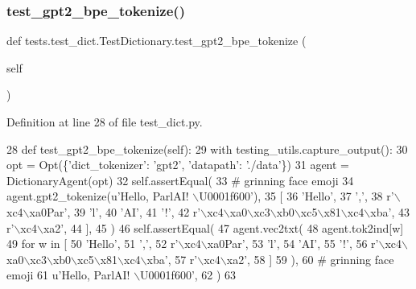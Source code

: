 \subsubsection{\texorpdfstring{test\+\_\+gpt2\+\_\+bpe\+\_\+tokenize()}{test\_gpt2\_bpe\_tokenize()}}
{\footnotesize\ttfamily def tests.\+test\+\_\+dict.\+Test\+Dictionary.\+test\+\_\+gpt2\+\_\+bpe\+\_\+tokenize (\begin{DoxyParamCaption}\item[{}]{self }\end{DoxyParamCaption})}



Definition at line 28 of file test\+\_\+dict.\+py.


\begin{DoxyCode}
28     \textcolor{keyword}{def }test\_gpt2\_bpe\_tokenize(self):
29         with testing\_utils.capture\_output():
30             opt = Opt(\{\textcolor{stringliteral}{'dict\_tokenizer'}: \textcolor{stringliteral}{'gpt2'}, \textcolor{stringliteral}{'datapath'}: \textcolor{stringliteral}{'./data'}\})
31             agent = DictionaryAgent(opt)
32         self.assertEqual(
33             \textcolor{comment}{# grinning face emoji}
34             agent.gpt2\_tokenize(\textcolor{stringliteral}{u'Hello, ParlAI! \(\backslash\)U0001f600'}),
35             [
36                 \textcolor{stringliteral}{'Hello'},
37                 \textcolor{stringliteral}{','},
38                 \textcolor{stringliteral}{r'\(\backslash\)xc4\(\backslash\)xa0Par'},
39                 \textcolor{stringliteral}{'l'},
40                 \textcolor{stringliteral}{'AI'},
41                 \textcolor{stringliteral}{'!'},
42                 \textcolor{stringliteral}{r'\(\backslash\)xc4\(\backslash\)xa0\(\backslash\)xc3\(\backslash\)xb0\(\backslash\)xc5\(\backslash\)x81\(\backslash\)xc4\(\backslash\)xba'},
43                 \textcolor{stringliteral}{r'\(\backslash\)xc4\(\backslash\)xa2'},
44             ],
45         )
46         self.assertEqual(
47             agent.vec2txt(
48                 agent.tok2ind[w]
49                 \textcolor{keywordflow}{for} w \textcolor{keywordflow}{in} [
50                     \textcolor{stringliteral}{'Hello'},
51                     \textcolor{stringliteral}{','},
52                     \textcolor{stringliteral}{r'\(\backslash\)xc4\(\backslash\)xa0Par'},
53                     \textcolor{stringliteral}{'l'},
54                     \textcolor{stringliteral}{'AI'},
55                     \textcolor{stringliteral}{'!'},
56                     \textcolor{stringliteral}{r'\(\backslash\)xc4\(\backslash\)xa0\(\backslash\)xc3\(\backslash\)xb0\(\backslash\)xc5\(\backslash\)x81\(\backslash\)xc4\(\backslash\)xba'},
57                     \textcolor{stringliteral}{r'\(\backslash\)xc4\(\backslash\)xa2'},
58                 ]
59             ),
60             \textcolor{comment}{# grinning face emoji}
61             \textcolor{stringliteral}{u'Hello, ParlAI! \(\backslash\)U0001f600'},
62         )
63 
\end{DoxyCode}
